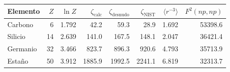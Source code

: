 \begin{tabular}{lrrrrrrr}
    \toprule
    Elemento & $Z$ & $\ln Z$ & $\zeta_{\text{calc}}$ & $\zeta_{\text{desnudo}}$ & $\zeta_{\text{NIST}}$ & $\langle r^{-3}\rangle$ & $F^2(np,np)$ \\
    \midrule
    Carbono & 6 & 1.792 & 42.2 & 59.3 & 28.9 & 1.692 & 53398.6 \\
    Silicio & 14 & 2.639 & 141.0 & 167.5 & 148.1 & 2.047 & 36421.4 \\
    Germanio & 32 & 3.466 & 823.7 & 896.3 & 920.6 & 4.793 & 35713.9 \\
    Estaño & 50 & 3.912 & 1885.9 & 1992.5 & 2241.1 & 6.819 & 32313.7 \\
    \bottomrule
\end{tabular}
